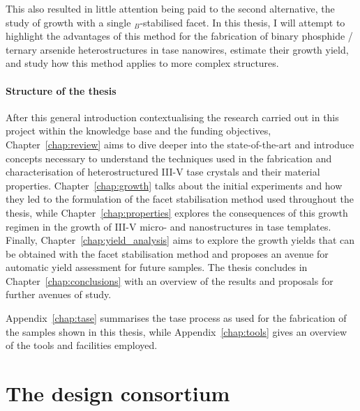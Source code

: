 This also resulted in little attention being paid to the second alternative, the study of growth with a single \(_B\)-stabilised facet. In this thesis, I will attempt to highlight the advantages of this method for the fabrication of binary phosphide / ternary arsenide heterostructures in \acs{tase} nanowires, estimate their growth yield, and study how this method applies to more complex structures.

\paragraph{Structure of the thesis} After this general introduction contextualising the research carried out in this project within the knowledge base and the funding objectives, Chapter~\ref{chap:review} aims to dive deeper into the state-of-the-art and introduce concepts necessary to understand the techniques used in the fabrication and characterisation of heterostructured III-V \acs{tase} crystals and their material properties. Chapter~\ref{chap:growth} talks about the initial experiments and how they led to the formulation of the facet stabilisation method used throughout the thesis, while Chapter~\ref{chap:properties} explores the consequences of this growth regimen in the growth of III-V micro- and nanostructures in \acs{tase} templates. Finally, Chapter~\ref{chap:yield_analysis} aims to explore the growth yields that can be obtained with the facet stabilisation method and proposes an avenue for automatic yield assessment for future samples. The thesis concludes in Chapter~\ref{chap:conclusions} with an overview of the results and proposals for further avenues of study. 

Appendix~\ref{chap:tase} summarises the \acs{tase} process as used for the fabrication of the samples shown in this thesis, while Appendix~\ref{chap:tools} gives an overview of the tools and facilities employed.
\par

\section{\texorpdfstring{The \acs{design} consortium}{The DESIGN-EID consortium}}

